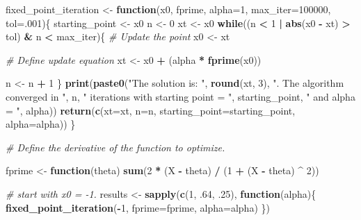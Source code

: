\documentclass[]{article}
\newenvironment{Shaded}{\begin{snugshade}}{\end{snugshade}}
\newcommand{\KeywordTok}[1]{\textcolor[rgb]{0.13,0.29,0.53}{\textbf{#1}}}
\newcommand{\DataTypeTok}[1]{\textcolor[rgb]{0.13,0.29,0.53}{#1}}
\newcommand{\DecValTok}[1]{\textcolor[rgb]{0.00,0.00,0.81}{#1}}
\newcommand{\StringTok}[1]{\textcolor[rgb]{0.31,0.60,0.02}{#1}}
\newcommand{\CommentTok}[1]{\textcolor[rgb]{0.56,0.35,0.01}{\textit{#1}}}
\newcommand{\ControlFlowTok}[1]{\textcolor[rgb]{0.13,0.29,0.53}{\textbf{#1}}}
\newcommand{\OperatorTok}[1]{\textcolor[rgb]{0.81,0.36,0.00}{\textbf{#1}}}
\newcommand{\NormalTok}[1]{#1}
\begin{document}
\begin{Shaded}
\begin{Highlighting}[]
\NormalTok{fixed_point_iteration <-}\StringTok{ }\ControlFlowTok{function}\NormalTok{(x0, fprime, }\DataTypeTok{alpha=}\DecValTok{1}\NormalTok{, }\DataTypeTok{max_iter=}\DecValTok{100000}\NormalTok{, }\DataTypeTok{tol=}\NormalTok{.}\DecValTok{001}\NormalTok{)\{}
\NormalTok{  starting_point <-}\StringTok{ }\NormalTok{x0}
\NormalTok{  n <-}\StringTok{ }\DecValTok{0}
\NormalTok{  xt <-}\StringTok{ }\NormalTok{x0}
  \ControlFlowTok{while}\NormalTok{((n }\OperatorTok{<}\StringTok{ }\DecValTok{1} \OperatorTok{|}\StringTok{ }\KeywordTok{abs}\NormalTok{(x0 }\OperatorTok{-}\StringTok{ }\NormalTok{xt) }\OperatorTok{>}\StringTok{ }\NormalTok{tol) }\OperatorTok{&}\StringTok{ }\NormalTok{n }\OperatorTok{<}\StringTok{ }\NormalTok{max_iter)\{}
    \CommentTok{# Update the point}
\NormalTok{    x0 <-}\StringTok{ }\NormalTok{xt}
    
    \CommentTok{# Define update equation}
\NormalTok{    xt <-}\StringTok{ }\NormalTok{x0 }\OperatorTok{+}\StringTok{ }\NormalTok{(alpha }\OperatorTok{*}\StringTok{ }\KeywordTok{fprime}\NormalTok{(x0))}
    
\NormalTok{    n <-}\StringTok{ }\NormalTok{n }\OperatorTok{+}\StringTok{ }\DecValTok{1}
\NormalTok{  \}}
  \KeywordTok{print}\NormalTok{(}\KeywordTok{paste0}\NormalTok{(}\StringTok{"The solution is: "}\NormalTok{, }\KeywordTok{round}\NormalTok{(xt, }\DecValTok{3}\NormalTok{), }\StringTok{". The algorithm converged in "}\NormalTok{, n, }\StringTok{" iterations with starting point = "}\NormalTok{, starting_point, }\StringTok{" and alpha = "}\NormalTok{, alpha))}
  \KeywordTok{return}\NormalTok{(}\KeywordTok{c}\NormalTok{(}\DataTypeTok{xt=}\NormalTok{xt,  }\DataTypeTok{n=}\NormalTok{n, }\DataTypeTok{starting_point=}\NormalTok{starting_point, }\DataTypeTok{alpha=}\NormalTok{alpha))}
\NormalTok{\}}

\CommentTok{# Define the derivative of the function to optimize. }

\NormalTok{fprime <-}\StringTok{ }\ControlFlowTok{function}\NormalTok{(theta) }\KeywordTok{sum}\NormalTok{(}\DecValTok{2} \OperatorTok{*}\StringTok{ }\NormalTok{(X }\OperatorTok{-}\StringTok{ }\NormalTok{theta) }\OperatorTok{/}\StringTok{ }\NormalTok{(}\DecValTok{1} \OperatorTok{+}\StringTok{ }\NormalTok{(X }\OperatorTok{-}\StringTok{ }\NormalTok{theta) }\OperatorTok{^}\StringTok{ }\DecValTok{2}\NormalTok{))}

\CommentTok{# start with x0 = -1.}
\NormalTok{results <-}\StringTok{ }\KeywordTok{sapply}\NormalTok{(}\KeywordTok{c}\NormalTok{(}\DecValTok{1}\NormalTok{, .}\DecValTok{64}\NormalTok{, .}\DecValTok{25}\NormalTok{), }\ControlFlowTok{function}\NormalTok{(alpha)\{}
  \KeywordTok{fixed_point_iteration}\NormalTok{(}\OperatorTok{-}\DecValTok{1}\NormalTok{, }\DataTypeTok{fprime=}\NormalTok{fprime, }\DataTypeTok{alpha=}\NormalTok{alpha)  }
\NormalTok{\})}
\end{Highlighting}
\end{Shaded}
\end{document}
